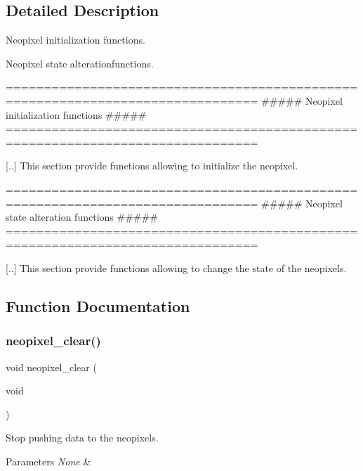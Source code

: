 \subsection{Detailed Description}
Neopixel initialization functions. 

Neopixel state alterationfunctions.

\begin{DoxyVerb} ===============================================================================
         ##### Neopixel initialization functions #####
 ===============================================================================

 [..] This section provide functions allowing to initialize the neopixel.\end{DoxyVerb}


\begin{DoxyVerb} ===============================================================================
         ##### Neopixel state alteration functions #####
 ===============================================================================

 [..] This section provide functions allowing to change the state of the neopixels.\end{DoxyVerb}
 

\subsection{Function Documentation}
\mbox{\label{group__neopixel_ga8e3cfef785ce221672f825f8785c25b8}} 
\subsubsection{\texorpdfstring{neopixel\+\_\+clear()}{neopixel\_clear()}}
{\footnotesize\ttfamily void neopixel\+\_\+clear (\begin{DoxyParamCaption}\item[{void}]{ }\end{DoxyParamCaption})}



Stop pushing data to the neopixels. 


\begin{DoxyParams}{Parameters}
{\em None} & \\
\hline
\end{DoxyParams}

